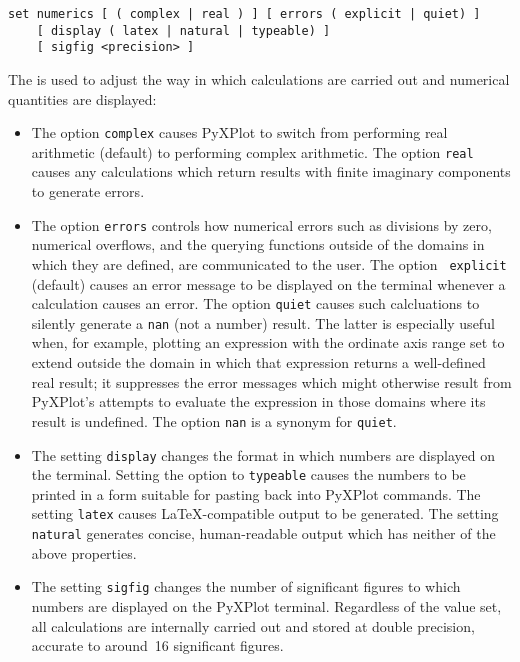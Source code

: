 \begin{verbatim}
set numerics [ ( complex | real ) ] [ errors ( explicit | quiet) ]
    [ display ( latex | natural | typeable) ]
    [ sigfig <precision> ]
\end{verbatim}

The  is used to adjust the way in which calculations are
carried out and numerical quantities are displayed:

\begin{itemize}

\item The option {\tt complex} causes PyXPlot to switch from performing real
arithmetic (default) to performing complex arithmetic. The option {\tt real}
causes any calculations which return results with finite imaginary components
to generate errors.

\item The option {\tt errors} controls how numerical errors such as divisions
by zero, numerical overflows, and the querying functions outside of the domains
in which they are defined, are communicated to the user.  The option {\tt
explicit} (default) causes an error message to be displayed on the terminal
whenever a calculation causes an error.  The option {\tt quiet} causes such
calcluations to silently generate a {\tt nan} (not a number) result. The latter
is especially useful when, for example, plotting an expression with the
ordinate axis range set to extend outside the domain in which that expression
returns a well-defined real result; it suppresses the error messages which
might otherwise result from PyXPlot's attempts to evaluate the expression in
those domains where its result is undefined. The option {\tt nan} is a synonym
for {\tt quiet}.

\item The setting {\tt display} changes the format in which numbers are
displayed on the terminal.  Setting the option to {\tt typeable} causes the
numbers to be printed in a form suitable for pasting back into PyXPlot
commands.  The setting {\tt latex} causes \LaTeX-compatible output to be
generated.  The setting {\tt natural} generates concise, human-readable output
which has neither of the above properties.

\item The setting {\tt sigfig} changes the number of significant figures to
which numbers are displayed on the PyXPlot terminal.  Regardless of the value
set, all calculations are internally carried out and stored at double
precision, accurate to around~16 significant figures.

\end{itemize}


